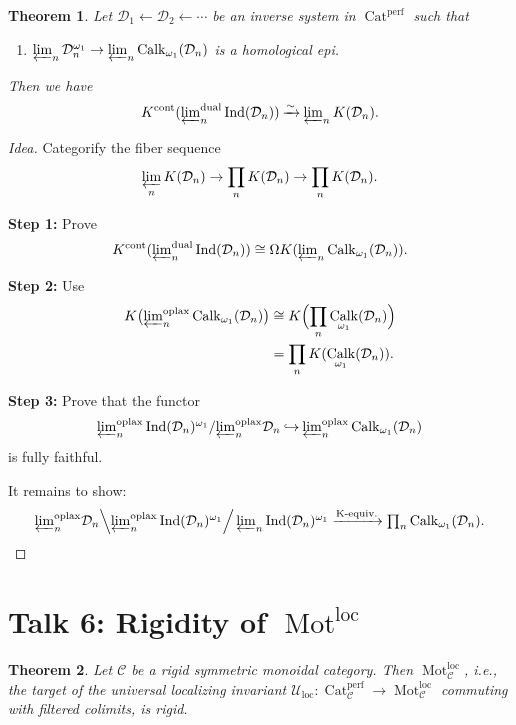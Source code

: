 \documentclass[draft]{amsart}
\newcommand{\cat}[1]{\mathcal{#1}}
\newcommand{\from}{\leftarrow}
\newcommand{\isoto}{\mathbin{\xrightarrow{\sim}}}
\newcommand{\injto}{\mathbin{\hookrightarrow}}
\DeclareMathOperator{\Ind}{Ind}
\DeclareMathOperator{\Cat}{Cat}
\DeclareMathOperator{\Calk}{Calk}
\DeclareMathOperator{\Mot}{Mot}
\newtheorem{thm}{Theorem}[section]
\theoremstyle{definition}
\begin{document}
\begin{thm}
Let $\cat D_1 \from \cat D_2 \from \dotsb$ be an inverse system in $\Cat^{\mathrm{perf}}$ such that
\begin{enumerate}[($*$)]
\item $\varprojlim_n \cat D_n^{\omega_1} \to \varprojlim_n \Calk_{\omega_1}(\cat D_n)$ is a homological epi.
\end{enumerate}
Then we have 
\[
K^{\mathrm{cont}}(\textstyle{\varprojlim_n^{\mathrm{dual}}} \Ind(\cat D_n))
\isoto \varprojlim_n K(\cat D_n).
\]
\end{thm}
\begin{proof}[Idea]
Categorify the fiber sequence 
\[
\varprojlim_n K(\cat D_n) \to \prod_n K(\cat D_n) \to \prod_n K(\cat D_n).
\]

\textbf{Step 1:} Prove
\[
K^{\mathrm{cont}}(\textstyle{\varprojlim_n^{\mathrm{dual}}} \Ind(\cat D_n)) \cong \Omega K(\varprojlim_n \Calk_{\omega_1}(\cat D_n)).
\]

\textbf{Step 2:} Use
\begin{align*}
K\bigl(\textstyle{\varprojlim_n^{\mathrm{oplax}}} \Calk_{\omega_1}(\cat D_n)\bigr) &\cong K\Bigl(\prod_n \Calk_{\omega_1}(\cat D_n)\Bigr) \\
&= \prod_n K(\Calk_{\omega_1}(\cat D_n)).
\end{align*}

\textbf{Step 3:} Prove that the functor
\[
\textstyle{\varprojlim_n^{\mathrm{oplax}}} \Ind(\cat D_n)^{\omega_1}/\textstyle{\varprojlim_n^{\mathrm{oplax}}} \cat D_n \injto \textstyle{\varprojlim_n^{\mathrm{oplax}}} \Calk_{\omega_1}(\cat D_n)
\]
is fully faithful.

It remains to show:
\[
\textstyle{\varprojlim_n^{\mathrm{oplax}}} \cat D_n \Big\backslash \textstyle{\varprojlim_n^{\mathrm{oplax}}} \Ind(\cat D_n)^{\omega_1} \Big/ \varprojlim_n \Ind(\cat D_n)^{\omega_1} \xrightarrow{\textnormal{K-equiv.}} \prod_n \Calk_{\omega_1}(\cat D_n).
\]
\end{proof}

\section{Talk 6: Rigidity of \texorpdfstring{$\Mot^{\mathrm{loc}}$}{Motloc}}

\begin{thm}
Let $\cat C$ be a rigid symmetric monoidal category. Then $\Mot_{\cat C}^{\mathrm{loc}}$, i.e., the target of the universal localizing invariant $\cat U_{\mathrm{loc}} \colon \Cat^{\mathrm{perf}}_{\cat C}\to \Mot^{\mathrm{loc}}_{\cat C}$ commuting with filtered colimits, is rigid.
\end{thm}
\end{document}
